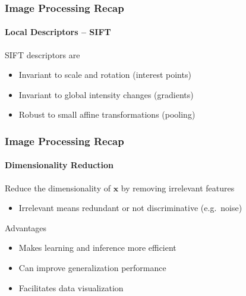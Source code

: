 \documentclass[xetex,professionalfont]{beamer}
\renewcommand{\vec}[1]{\ensuremath{\mathbf{#1}}}
\newcommand{\vx}{\vec{x}}
\begin{document}
\begin{frame}
\frametitle{Image Processing Recap}
\framesubtitle{Local Descriptors -- SIFT}

SIFT descriptors are
\begin{itemize}
    \item Invariant to scale and rotation (interest points)
    \item Invariant to global intensity changes (gradients)
    \item Robust to small affine transformations (pooling)
\end{itemize}

\end{frame}


\begin{frame}
\frametitle{Image Processing Recap}
\framesubtitle{Dimensionality Reduction}

Reduce the dimensionality of $\vx$ by removing irrelevant features  %
\begin{itemize}
    \item Irrelevant means redundant or not discriminative (e.g.\ noise)
\end{itemize}

\bigskip
Advantages
\begin{itemize}
    \item Makes learning and inference more efficient  %
    \item Can improve generalization performance  %
    \item Facilitates data visualization  %
\end{itemize}

\end{frame}

\end{document}
